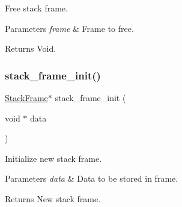 Free stack frame. 


\begin{DoxyParams}{Parameters}
{\em frame} & Frame to free. \\
\hline
\end{DoxyParams}
\begin{DoxyReturn}{Returns}
Void. 
\end{DoxyReturn}
\mbox{\label{group__StackFrame_ga2ecf08ec1545d0db09d8558460770c53}} 
\subsubsection{\texorpdfstring{stack\+\_\+frame\+\_\+init()}{stack\_frame\_init()}}
{\footnotesize\ttfamily \hyperlink{structStackFrame}{Stack\+Frame}$\ast$ stack\+\_\+frame\+\_\+init (\begin{DoxyParamCaption}\item[{void $\ast$}]{data }\end{DoxyParamCaption})}



Initialize new stack frame. 


\begin{DoxyParams}{Parameters}
{\em data} & Data to be stored in frame. \\
\hline
\end{DoxyParams}
\begin{DoxyReturn}{Returns}
New stack frame. 
\end{DoxyReturn}
